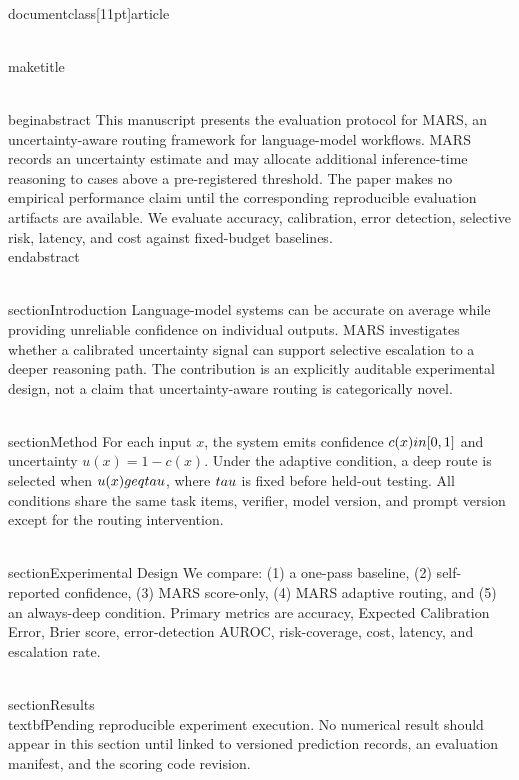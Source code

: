 \\documentclass[11pt]{article}
\begin{document}
\\maketitle

\\begin{abstract}
This manuscript presents the evaluation protocol for MARS, an uncertainty-aware routing framework for language-model workflows. MARS records an uncertainty estimate and may allocate additional inference-time reasoning to cases above a pre-registered threshold. The paper makes no empirical performance claim until the corresponding reproducible evaluation artifacts are available. We evaluate accuracy, calibration, error detection, selective risk, latency, and cost against fixed-budget baselines.
\\end{abstract}

\\section{Introduction}
Language-model systems can be accurate on average while providing unreliable confidence on individual outputs. MARS investigates whether a calibrated uncertainty signal can support selective escalation to a deeper reasoning path. The contribution is an explicitly auditable experimental design, not a claim that uncertainty-aware routing is categorically novel.

\\section{Method}
For each input $x$, the system emits confidence $c(x)\\in[0,1]$ and uncertainty $u(x)=1-c(x)$. Under the adaptive condition, a deep route is selected when $u(x)\\geq\\tau$, where $\\tau$ is fixed before held-out testing. All conditions share the same task items, verifier, model version, and prompt version except for the routing intervention.

\\section{Experimental Design}
We compare: (1) a one-pass baseline, (2) self-reported confidence, (3) MARS score-only, (4) MARS adaptive routing, and (5) an always-deep condition. Primary metrics are accuracy, Expected Calibration Error, Brier score, error-detection AUROC, risk-coverage, cost, latency, and escalation rate.

\\section{Results}
\\textbf{Pending reproducible experiment execution.} No numerical result should appear in this section until linked to versioned prediction records, an evaluation manifest, and the scoring code revision.
\end{document}
